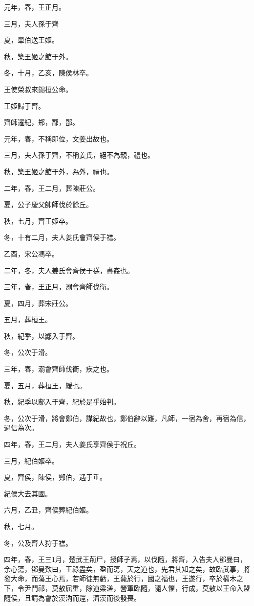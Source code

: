 
\begin{pinyinscope}
元年，春，王正月。

三月，夫人孫于齊

夏，單伯送王姬。

秋，築王姬之館于外。

冬，十月，乙亥，陳侯林卒。

王使榮叔來錫桓公命。

王姬歸于齊。

齊師遷紀，郱，鄑，郚。

元年，春，不稱即位，文姜出故也。

三月，夫人孫于齊，不稱姜氏，絕不為親，禮也。

秋，築王姬之館于外，為外，禮也。

二年，春，王二月，葬陳莊公。

夏，公子慶父帥師伐於餘丘。

秋，七月，齊王姬卒。

冬，十有二月，夫人姜氏會齊侯于禚。

乙酉，宋公馮卒。

二年，冬，夫人姜氏會齊侯于禚，書姦也。

三年，春，王正月，溺會齊師伐衛。

夏，四月，葬宋莊公。

五月，葬桓王。

秋，紀季，以酅入于齊。

冬，公次于滑。

三年，春，溺會齊師伐衛，疾之也。

夏，五月，葬桓王，緩也。

秋，紀季以酅入于齊，紀於是乎始判。

冬，公次于滑，將會鄭伯，謀紀故也，鄭伯辭以難，凡師，一宿為舍，再宿為信，過信為次。

四年，春，王二月，夫人姜氏享齊侯于祝丘。

三月，紀伯姬卒。

夏，齊侯，陳侯，鄭伯，遇于垂。

紀侯大去其國。

六月，乙丑，齊侯葬紀伯姬。

秋，七月。

冬，公及齊人狩于禚。

四年，春，王三1月，楚武王荊尸，授師孑焉，以伐隨，將齊，入告夫人鄧曼曰，余心蕩，鄧曼歎曰，王祿盡矣，盈而蕩，天之道也，先君其知之矣，故臨武事，將發大命，而蕩王心焉，若師徒無虧，王薨於行，國之福也，王遂行，卒於樠木之下，令尹鬥祁，莫敖屈重，除道梁溠，營軍臨隨，隨人懼，行成，莫敖以王命入盟隨侯，且請為會於漢汭而還，濟漢而後發喪。


\end{pinyinscope}
